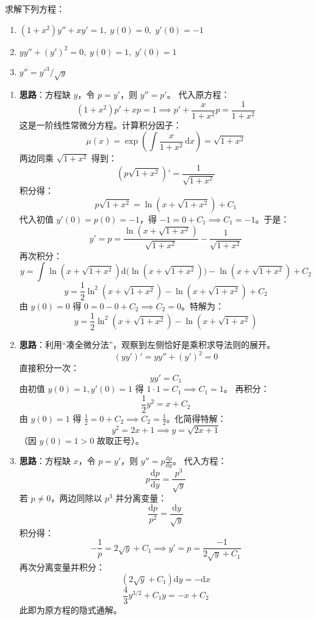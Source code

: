 \documentclass[lang=cn,11pt]{elegantbook}
\begin{document}
\begin{exercise}[缺 $y$ 型与缺 $x$ 型]
求解下列方程：
\begin{enumerate}
  \item[(1)] $(1+x^{2})y''+xy'=1,\;y(0)=0,\;y'(0)=-1$
  \item[(2)] $yy''+(y')^{2}=0,\;y(0)=1,\;y'(0)=1$
  \item[(3)] $y''=y'^{3}/\sqrt{y}$
\end{enumerate}
\end{exercise}
\begin{solution}
\begin{enumerate}
  \item[(1)] \textbf{思路}：方程缺 $y$，令 $p=y'$，则 $y''=p'$。
  代入原方程：
  \[
  (1+x^2)p' + xp = 1 \implies p' + \frac{x}{1+x^2}p = \frac{1}{1+x^2}
  \]
  这是一阶线性常微分方程。计算积分因子：
  \[
  \mu(x) = \exp\left(\int \frac{x}{1+x^2}\,\mathrm{d}x\right) = \sqrt{1+x^2}
  \]
  两边同乘 $\sqrt{1+x^2}$ 得到：
  \[
  (p\sqrt{1+x^2})' = \frac{1}{\sqrt{1+x^2}}
  \]
  积分得：
  \[
  p\sqrt{1+x^2} = \ln(x+\sqrt{1+x^2}) + C_1
  \]
  代入初值 $y'(0)=p(0)=-1$，得 $-1 = 0 + C_1 \implies C_1 = -1$。于是：
  \[
  y' = p = \frac{\ln(x+\sqrt{1+x^2})}{\sqrt{1+x^2}} - \frac{1}{\sqrt{1+x^2}}
  \]
  再次积分：
  \[
  y = \int \ln(x+\sqrt{1+x^2}) \mathrm{d}\big(\ln(x+\sqrt{1+x^2})\big) - \ln(x+\sqrt{1+x^2}) + C_2
  \]
  \[
  y = \frac{1}{2}\ln^2(x+\sqrt{1+x^2}) - \ln(x+\sqrt{1+x^2}) + C_2
  \]
  由 $y(0)=0$ 得 $0 = 0 - 0 + C_2 \implies C_2=0$。特解为：
  \[
  \boxed{y = \frac{1}{2}\ln^2(x+\sqrt{1+x^2}) - \ln(x+\sqrt{1+x^2})}
  \]

  \item[(2)] \textbf{思路}：利用“凑全微分法”，观察到左侧恰好是乘积求导法则的展开。
  \[
  (yy')' = yy'' + (y')^2 = 0
  \]
  直接积分一次：
  \[
  yy' = C_1
  \]
  由初值 $y(0)=1, y'(0)=1$ 得 $1 \cdot 1 = C_1 \implies C_1=1$。
  再积分：
  \[
  \frac{1}{2}y^2 = x + C_2
  \]
  由 $y(0)=1$ 得 $\frac{1}{2} = 0 + C_2 \implies C_2 = \frac{1}{2}$。化简得特解：
  \[
  y^2 = 2x + 1 \implies \boxed{y = \sqrt{2x+1}}
  \]
  （因 $y(0)=1>0$ 故取正号）。
  
  \item[(3)] \textbf{思路}：方程缺 $x$，令 $p=y'$，则 $y''=p\frac{\mathrm{d}p}{\mathrm{d}y}$。
  代入方程：
  \[
  p\frac{\mathrm{d}p}{\mathrm{d}y} = \frac{p^3}{\sqrt{y}}
  \]
  若 $p \neq 0$，两边同除以 $p^3$ 并分离变量：
  \[
  \frac{\mathrm{d}p}{p^2} = \frac{\mathrm{d}y}{\sqrt{y}}
  \]
  积分得：
  \[
  -\frac{1}{p} = 2\sqrt{y} + C_1 \implies y' = p = \frac{-1}{2\sqrt{y}+C_1}
  \]
  再次分离变量并积分：
  \[
  (2\sqrt{y}+C_1)\mathrm{d}y = -\mathrm{d}x
  \]
  \[
  \boxed{\frac{4}{3}y^{3/2} + C_1y = -x + C_2}
  \]
  此即为原方程的隐式通解。
\end{enumerate}
\end{solution}
\end{document}
